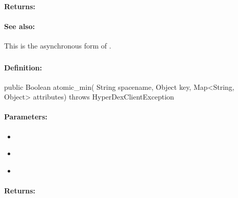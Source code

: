 \paragraph{Returns:}


\paragraph{See also:}  This is the asynchronous form of .

\pagebreak
\subsubsection{}
\label{api:java:atomic_min}


\paragraph{Definition:}
\begin{javacode}
public Boolean atomic_min(
        String spacename,
        Object key,
        Map<String, Object> attributes) throws HyperDexClientException
\end{javacode}

\paragraph{Parameters:}
\begin{itemize}[noitemsep]
\item {}\\

\item {}\\

\item {}\\

\end{itemize}

\paragraph{Returns:}


